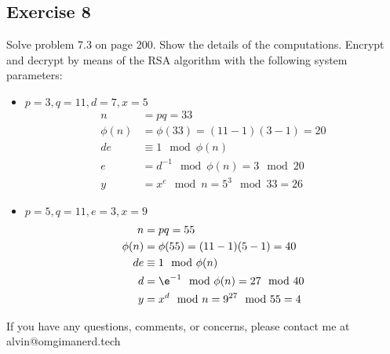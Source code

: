\documentclass{math}
\begin{document}
\subsection*{Exercise 8}
Solve problem 7.3 on page 200. Show the details of the computations. Encrypt
and decrypt by means of the RSA algorithm with the following system parameters:
\begin{itemize}
  \item \( p = 3, q = 11, d = 7, x = 5 \)
  \begin{align*}
    n &= pq = 33 \\
    \phi(n) &= \phi(33) = (11-1)(3-1) = 20 \\
    de &\equiv 1\mod\phi(n) \\
    e &= d^{-1}\mod\phi(n) = 3\mod20 \\
    y &= x^e\mod n = 5^3\mod 33 = 26
  \end{align*}
  \item \( p = 5, q = 11, e = 3, x = 9 \)
  \begin{align*}
    n &= pq = 55 \\
    \phi(n) &= \phi(55) = (11-1)(5-1) = 40 \\
    de &\equiv 1\mod\phi(n) \\
    d &= \e^{-1}\mod\phi(n) = 27\mod40 \\
    y &= x^d\mod n = 9^{27}\mod55 = 4
  \end{align*}
\end{itemize}

\begin{center}
  If you have any questions, comments, or concerns, please contact me at
  alvin@omgimanerd.tech
\end{center}
\end{document}

